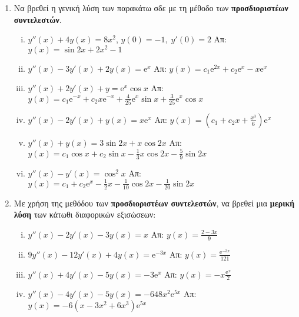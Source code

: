 \begin{enumerate}
  \item Να βρεθεί η γενική λύση των παρακάτω σδε με τη μέθοδο των 
    \textbf{προσδιοριστέων συντελεστών}.
    \begin{enumerate}[i)]
      \item $ y''(x)+4y(x)=8x^{2} $, \quad $ y(0)=-1, \; y'(0)=2 $ 
        \hfill Απ: $ y(x)= \sin{2x} + 2x^{2}-1 $ 
      \item $ y''(x)-3y'(x)+2y(x)= \mathrm{e}^{x} $
        \hfill Απ: $ y(x)= c_{1} \mathrm{e}^{2x} + c_{2} \mathrm{e}^{x} - x
        \mathrm{e}^{x}  $ 
      \item $ y''(x) +2y'(x)+y= \mathrm{e}^{x} \cos{x} $
        \hfill Απ: $ y(x)= c_{1} \mathrm{e}^{-x} + c_{2}x \mathrm{e}^{-x} +
        \frac{4}{25} \mathrm{e}^{x} \sin{x} + \frac{3}{25} \mathrm{e}^{x} \cos{x} $  
      \item $y''(x)-2y'(x)+y(x)=x\mathrm{e}^{x}$ 
        \hfill Απ:  $y(x)=(c_{1}+c_{2}x+\frac{x^{3}}{6})\mathrm{e}^{x}$
      \item $y''(x)+y(x)=3\sin 2x + x\cos 2x$ 
        \hfill Απ: $y(x)=c_{1}\cos x+c_{2}\sin x-\frac{1}{3}x\cos 2x-\frac{5}{9}\sin 2x $
      \item $y''(x)-y'(x)=\cos^{2}x$ 
        \hfill Απ: $y(x) =c_{1}+c_{2}\mathrm{e}^{x}-\frac{1}{2}x-\frac{1}{10}\cos 2x- 
        \frac{1}{20}\sin 2x$
    \end{enumerate}

  \item Με χρήση της μεθόδου των \textbf{προσδιοριστέων συντελεστών}, να βρεθεί 
    μια \textbf{μερική λύση} των κάτωθι διαφορικών εξισώσεων:
    \begin{enumerate}[i)]
      \item $y''(x)-2y'(x)-3y(x)=x$ \hfill Απ: $y(x)=\frac{2-3x}{9}$
      \item $9y''(x)-12y'(x)+4y(x)=\mathrm{e}^{-3x}$ 
        \hfill Απ: $y(x)=\frac{\mathrm{e}^{-3x}}{121}$
      \item $y''(x)+4y'(x)-5y(x)=-3\mathrm{e}^{x}$ 
        \hfill Απ: $y(x)=-x\frac{\mathrm{e}^{x}}{2}$
      \item $y''(x)-4y'(x)-5y(x)=-648x^{2}\mathrm{e}^{5x}$ 
        \hfill Απ: $ y(x)=-6(x-3x^{2}+6x^{3})\mathrm{e}^{5x}$
    \end{enumerate}


\end{enumerate}
